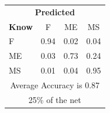 \documentclass[12pt]{article} %
\begin{document}
\begin{minipage}{0.5\textwidth}
\begin{center}
\begin{tabular}{l|c|c|c|}
 \multicolumn{4}{c}{ \textbf{ Predicted}}\\
 \textbf{Know}&F&ME&MS\\ \hline\hline
F   &0.94&0.02&0.04\\
ME &0.03&0.73&0.24\\
MS &0.01&0.04&0.95\\
\multicolumn{4}{c}{Average Accuracy is 0.87}\\
\multicolumn{4}{c}{25\%  of the net}\\
\end{tabular}
\end{center}
\end{minipage}


\newpage
\end{document}
